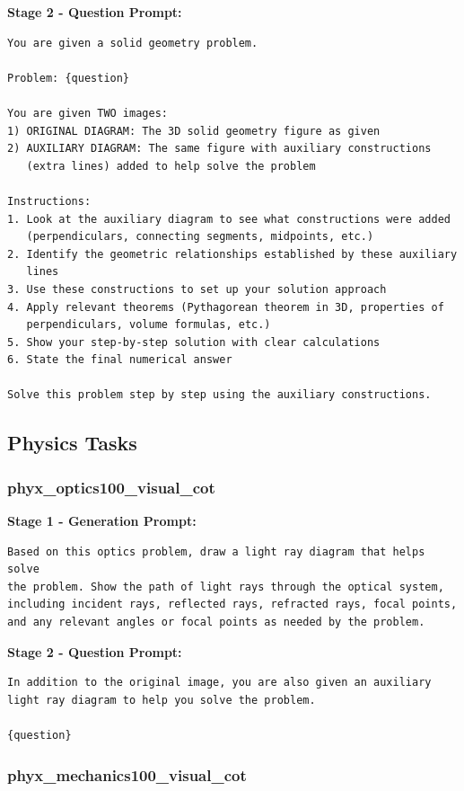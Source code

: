 \documentclass{article}
\theoremstyle{plain}
\theoremstyle{definition}
\theoremstyle{remark}
\begin{document}
\textbf{Stage 2 - Question Prompt:}

\begin{verbatim}
You are given a solid geometry problem.

Problem: {question}

You are given TWO images:
1) ORIGINAL DIAGRAM: The 3D solid geometry figure as given
2) AUXILIARY DIAGRAM: The same figure with auxiliary constructions
   (extra lines) added to help solve the problem

Instructions:
1. Look at the auxiliary diagram to see what constructions were added
   (perpendiculars, connecting segments, midpoints, etc.)
2. Identify the geometric relationships established by these auxiliary
   lines
3. Use these constructions to set up your solution approach
4. Apply relevant theorems (Pythagorean theorem in 3D, properties of
   perpendiculars, volume formulas, etc.)
5. Show your step-by-step solution with clear calculations
6. State the final numerical answer

Solve this problem step by step using the auxiliary constructions.
\end{verbatim}

\subsection{Physics Tasks}

\subsubsection{phyx\_optics100\_visual\_cot}

\textbf{Stage 1 - Generation Prompt:}

\begin{verbatim}
Based on this optics problem, draw a light ray diagram that helps solve
the problem. Show the path of light rays through the optical system,
including incident rays, reflected rays, refracted rays, focal points,
and any relevant angles or focal points as needed by the problem.
\end{verbatim}

\textbf{Stage 2 - Question Prompt:}

\begin{verbatim}
In addition to the original image, you are also given an auxiliary
light ray diagram to help you solve the problem.

{question}
\end{verbatim}

\subsubsection{phyx\_mechanics100\_visual\_cot}
\end{document}
